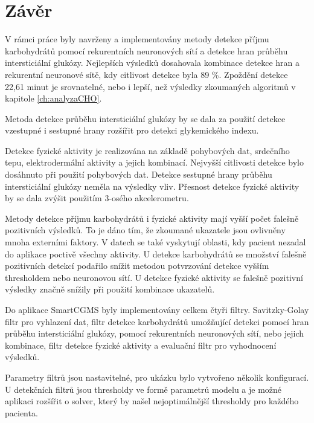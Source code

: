 \chapter{Závěr}

V rámci práce byly navrženy a implementovány metody detekce příjmu karbohydrátů pomocí rekurentních neuronových sítí a detekce hran průběhu intersticiální glukózy. Nejlepších výsledků dosahovala kombinace detekce hran a rekurentní neuronové sítě, kdy citlivost detekce byla 89 \%. Zpoždění detekce 22,61 minut je srovnatelné, nebo i lepší, než výsledky zkoumaných algoritmů v kapitole \ref{ch:analyzaCHO}.

Metoda detekce průběhu intersticiální glukózy by se dala za použití detekce vzestupné i sestupné hrany rozšířit pro detekci glykemického indexu.

Detekce fyzické aktivity je realizována na základě pohybových dat, srdečního tepu, elektrodermální aktivity a jejich kombinací. Nejvyšší citlivosti detekce bylo dosáhnuto při použití pohybových dat. Detekce sestupné hrany průběhu intersticiální glukózy neměla na výsledky vliv. Přesnost detekce fyzické aktivity by se dala zvýšit použitím 3-osého akcelerometru.

Metody detekce příjmu karbohydrátů i fyzické aktivity mají vyšší počet falešně pozitivních výsledků. To je dáno tím, že zkoumané ukazatele jsou ovlivněny mnoha externími faktory. V datech se také vyskytují oblasti, kdy pacient nezadal do aplikace poctivě všechny aktivity. U detekce karbohydrátů se množství falešně pozitivních detekcí podařilo snížit metodou potvrzování detekce vyšším thresholdem nebo neuronovou sítí. U detekce fyzické aktivity se falešně pozitivní výsledky značně snížily při použití kombinace ukazatelů.

Do aplikace SmartCGMS byly implementovány celkem čtyři filtry. Savitzky-Golay filtr pro vyhlazení dat, filtr detekce karbohydrátů umožňující detekci pomocí hran průběhu intersticiální glukózy, pomocí rekurentních neuronových sítí, nebo jejich kombinace, filtr detekce fyzické aktivity a evaluační filtr pro vyhodnocení výsledků.

Parametry filtrů jsou nastavitelné, pro ukázku bylo vytvořeno několik konfigurací. U detekčních filtrů jsou thresholdy ve formě parametrů modelu a je možné aplikaci rozšířit o solver, který by našel nejoptimálnější thresholdy pro každého pacienta.

